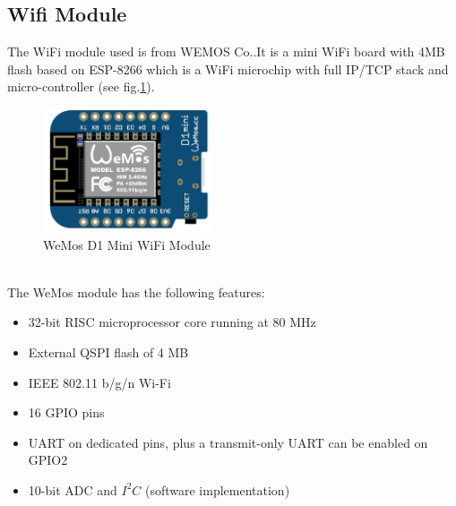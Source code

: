 \subsection{Wifi Module}
The WiFi module used is from WEMOS Co.\cite{wemosd1mini}.It is a mini WiFi board with 4MB flash based on ESP-8266 which is a WiFi microchip with full IP/TCP stack and micro-controller (see fig.\ref{wemos}).
\begin{figure}[!htbp]
	\centering
	\includegraphics[width = 5cm]{Pictures/wemos}
	\caption[The ListOfFigures caption]{WeMos D1 Mini WiFi Module \footnotemark[2]}
	\label{wemos}
\end{figure}
\\
The WeMos module has the following features:
\begin{itemize}
	\item 32-bit RISC microprocessor core running at 80 MHz
	\item External QSPI flash of 4 MB
	\item IEEE 802.11 b/g/n Wi-Fi
	\item 16 GPIO pins
	\item UART on dedicated pins, plus a transmit-only UART can be enabled on GPIO2
	\item 10-bit ADC and \(I^2C\) (software implementation)
\end{itemize}
